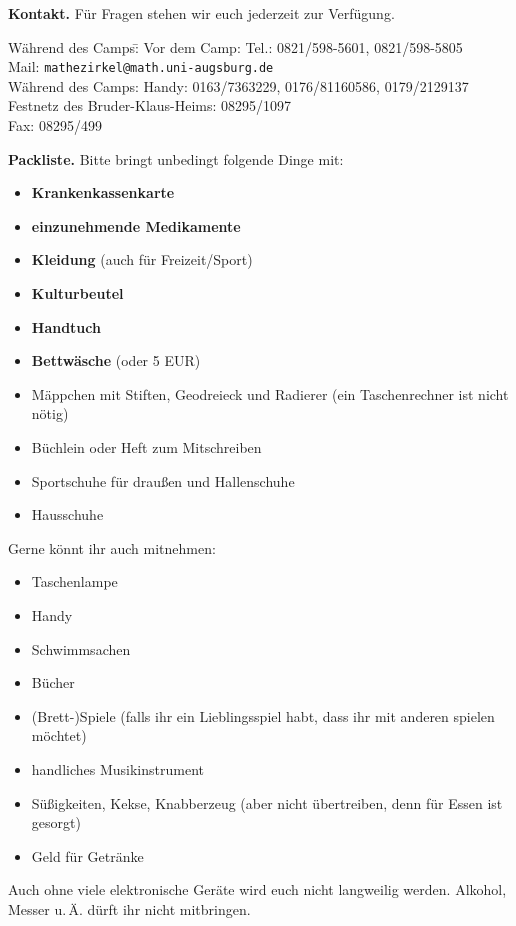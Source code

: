 \documentclass[12pt]{zettel}
\begin{document}
\newpage

\begin{shaded}
\textbf{Kontakt.} Für Fragen stehen wir euch jederzeit zur Verfügung.
\begin{tabbing}
  Während des Camps:\quad \= \kill
  Vor dem Camp: \> Tel.: 0821/598-5601, 0821/598-5805 \\
  \> Mail: \texttt{mathezirkel@math.uni-augsburg.de} \\[0.5em]
  Während des Camps: \> Handy: 0163/7363229, 0176/81160586, 0179/2129137 \\
  \> Festnetz des Bruder-Klaus-Heims: 08295/1097 \\
  \> Fax: 08295/499
\end{tabbing}
\end{shaded}

\begin{shaded}
\textbf{Packliste.} Bitte bringt unbedingt folgende Dinge mit:
\begin{multicols}{2}
\begin{itemize}
\item \textbf{Krankenkassenkarte}
\item \textbf{einzunehmende Medikamente}
\item \textbf{Kleidung} (auch für Freizeit/Sport)
\item \textbf{Kulturbeutel}
\item \textbf{Handtuch}
\item \textbf{Bettwäsche} (oder 5 EUR)
\item Mäppchen mit Stiften, Geodreieck und Radierer (ein Taschenrechner ist
nicht nötig)
\item Büchlein oder Heft zum Mitschreiben
\item Sportschuhe für draußen und Hallenschuhe
\item Hausschuhe
\end{itemize}
\end{multicols}
Gerne könnt ihr auch mitnehmen:
\begin{multicols}{2}
\begin{itemize}
\item Taschenlampe
\item Handy
\item Schwimmsachen
\item Bücher
\item (Brett-)Spiele (falls ihr ein Lieblingsspiel habt, dass ihr mit anderen
spielen möchtet)
\item handliches Musikinstrument
\item Süßigkeiten, Kekse, Knabberzeug (aber nicht übertreiben, denn für Essen
ist gesorgt)
\item Geld für Getränke
\end{itemize}
\end{multicols}
Auch ohne viele elektronische Geräte wird euch nicht langweilig werden.
Alkohol, Messer u.\,Ä. dürft ihr nicht mitbringen.
\end{shaded}
\end{document}
